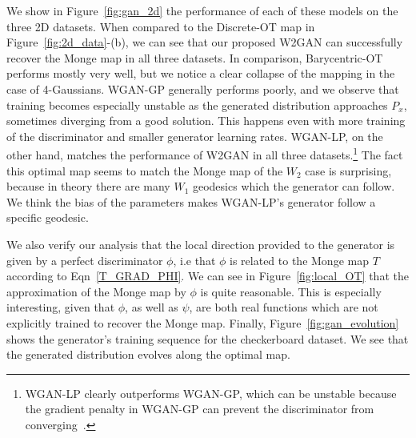 \documentclass[runningheads]{llncs}
\begin{document}
We show in Figure~\ref{fig:gan_2d} the performance of each of these models on the three 2D datasets.
When compared to the Discrete-OT map in Figure~\ref{fig:2d_data}-(b), we can see that
our proposed W2GAN can successfully recover the Monge map in all three datasets.
In comparison, Barycentric-OT performs mostly very well, but we notice a clear collapse of the mapping in the case of 4-Gaussians. WGAN-GP generally performs poorly, and we observe that training becomes especially unstable as the generated distribution approaches $P_x$, sometimes diverging from a good solution. This happens even with more training of the discriminator and smaller generator learning rates. WGAN-LP, on the other hand, matches the performance of W2GAN in all three datasets.\footnote{WGAN-LP clearly outperforms WGAN-GP, which can be unstable because the gradient penalty in WGAN-GP can prevent the discriminator from converging~\citep{petzka2018on}.} The fact this optimal map seems to match the Monge map of the $W_2$ case is surprising, because in theory there are many $W_1$ geodesics which the generator can follow. We think the bias of the parameters makes WGAN-LP's generator follow a specific geodesic.  %



We also verify our analysis that the local direction provided to the generator is given by a perfect discriminator $\phi$, i.e that $\phi$ is related to the Monge map $T$ according to 
Eqn~\eqref{T_GRAD_PHI}. We can see in Figure~\ref{fig:local_OT} that the approximation of the Monge map by $\phi$ is quite reasonable. This is especially interesting, given that $\phi$, as well as $\psi$, are both real functions which are not explicitly trained to recover the Monge map. Finally, Figure~\ref{fig:gan_evolution} shows the generator's training sequence for the checkerboard dataset. We see that the generated distribution evolves along the optimal map.
\end{document}
